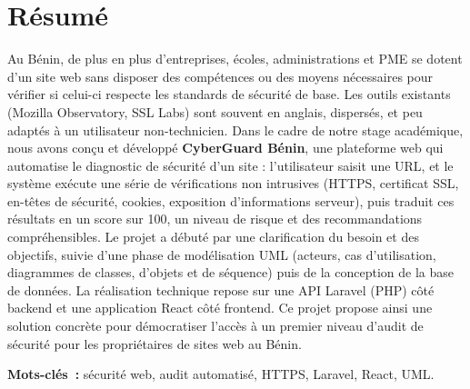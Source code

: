 \chapter*{R\'esum\'e}

Au B\'enin, de plus en plus d'entreprises, \'ecoles, administrations et PME se dotent
d'un site web sans disposer des comp\'etences ou des moyens n\'ecessaires pour
v\'erifier si celui-ci respecte les standards de s\'ecurit\'e de base. Les outils existants
(Mozilla Observatory, SSL Labs) sont souvent en anglais, dispers\'es, et peu adapt\'es
\`a un utilisateur non-technicien. Dans le cadre de notre stage acad\'emique, nous avons
con\c{c}u et d\'evelopp\'e \textbf{CyberGuard B\'enin}, une plateforme web qui automatise
le diagnostic de s\'ecurit\'e d'un site : l'utilisateur saisit une URL, et le syst\`eme
ex\'ecute une s\'erie de v\'erifications non intrusives (HTTPS, certificat SSL, en-t\^etes
de s\'ecurit\'e, cookies, exposition d'informations serveur), puis traduit ces r\'esultats
en un score sur 100, un niveau de risque et des recommandations compr\'ehensibles.
Le projet a d\'ebut\'e par une clarification du besoin et des objectifs, suivie d'une
phase de mod\'elisation UML (acteurs, cas d'utilisation, diagrammes de classes,
d'objets et de s\'equence) puis de la conception de la base de donn\'ees. La
r\'ealisation technique repose sur une API Laravel (PHP) c\^ot\'e backend et une
application React c\^ot\'e frontend. Ce projet propose ainsi une solution concr\`ete
pour d\'emocratiser l'acc\`es \`a un premier niveau d'audit de s\'ecurit\'e pour les
propri\'etaires de sites web au B\'enin.

\bigskip
\noindent\textbf{Mots-cl\'es~:} s\'ecurit\'e web, audit automatis\'e, HTTPS, Laravel,
React, UML.
